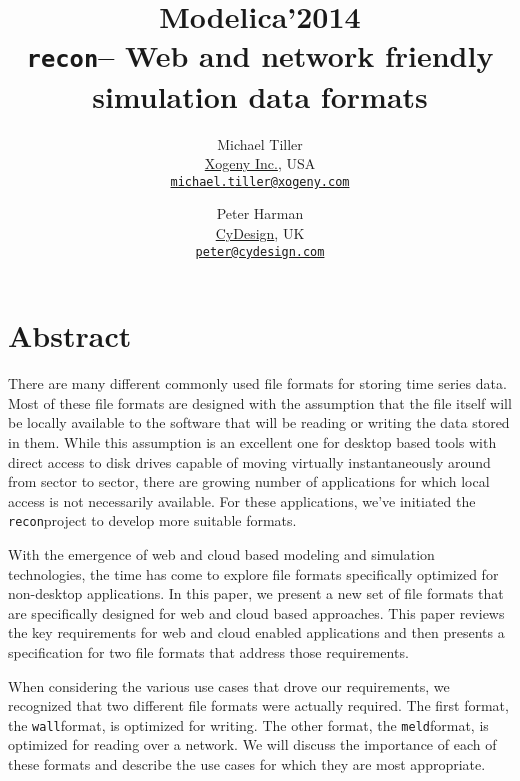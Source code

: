 \documentclass[11pt,a4paper,twocolumn]{article}
\newcommand{\recon}{\texttt{recon}}
\newcommand{\wall}{\texttt{wall}}
\newcommand{\meld}{\texttt{meld}}
\begin{document}
\title{\textbf{{\small Modelica'2014}\\
    \recon -- Web and network friendly simulation data formats}}

\author{Michael Tiller\\
  \href{http://xogeny.com}{Xogeny Inc.}, USA\\
  \href{mailto:michael.tiller@xogeny.com}
       {\nolinkurl{michael.tiller@xogeny.com}}
  \and Peter Harman\\
  \href{http://www.cydesign.com}
       {CyDesign}, UK\\
  \href{mailto:peter@cydesign.com}{\nolinkurl{peter@cydesign.com}}}
\date{} %
\maketitle\thispagestyle{empty} %

\section*{Abstract}

There are many different commonly used file formats for storing time
series data.  Most of these file formats are designed with the
assumption that the file itself will be locally available to the
software that will be reading or writing the data stored in them.
While this assumption is an excellent one for desktop based tools with
direct access to disk drives capable of moving virtually
instantaneously around from sector to sector, there are growing number
of applications for which local access is not necessarily available.
For these applications, we've initiated the \recon project to develop
more suitable formats.

With the emergence of web and cloud based modeling and simulation
technologies, the time has come to explore file formats specifically
optimized for non-desktop applications.  In this paper, we present a
new set of file formats that are specifically designed for web and
cloud based approaches.  This paper reviews the key requirements for
web and cloud enabled applications and then presents a specification
for two file formats that address those requirements.

When considering the various use cases that drove our requirements, we
recognized that two different file formats were actually required.
The first format, the \wall format, is optimized for writing.  The
other format, the \meld format, is optimized for reading over a
network.  We will discuss the importance of each of these formats and
describe the use cases for which they are most appropriate.
\end{document}
